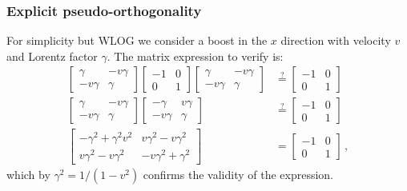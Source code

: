 \documentclass[main.tex]{subfiles}
\begin{document}
\subsubsection{Explicit pseudo-orthogonality}

For simplicity but WLOG we consider a boost in the \(x\) direction with velocity \(v\) and Lorentz factor \(\gamma\). The matrix expression to verify is:
%
\begin{subequations}
\begin{align}
  \begin{bmatrix}
  \gamma    & - v \gamma  \\
    -v \gamma & \gamma
  \end{bmatrix}
  \begin{bmatrix}
    -1 & 0 \\
    0 & 1
  \end{bmatrix}
  \begin{bmatrix}
    \gamma & -v \gamma \\
     -v \gamma&  \gamma
  \end{bmatrix}
  &\overset{?}{=}
  \begin{bmatrix}
  -1   & 0 \\
  0   & 1
\end{bmatrix} \\
  \begin{bmatrix}
  \gamma    & - v \gamma  \\
    -v \gamma & \gamma
  \end{bmatrix}
  \begin{bmatrix}
    -\gamma & v \gamma \\
    -v \gamma&  \gamma
  \end{bmatrix}
  &\overset{?}{=}
  \begin{bmatrix}
  -1   & 0 \\
  0   & 1
\end{bmatrix} \\
  \begin{bmatrix}
  -\gamma^2 + \gamma^2 v^2    & v \gamma^2 - v \gamma^2  \\
    v \gamma^2 -v \gamma^2 & -v\gamma^2 +\gamma^2
  \end{bmatrix}
  &=
  \begin{bmatrix}
  -1   & 0 \\
  0   & 1
\end{bmatrix}\,,
\end{align}
\end{subequations}
%
which by \(\gamma^2 = 1/ (1-v^2)\) confirms the validity of the expression.
\end{document}
